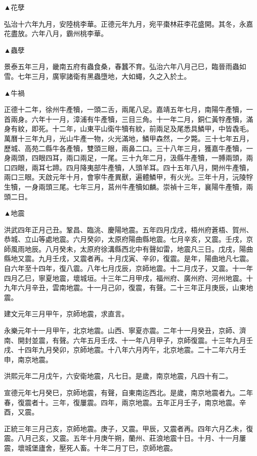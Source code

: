 \begin{pinyinscope}
▲花孽

弘治十六年九月，安陸桃李華。正德元年九月，宛平棗林莊李花盛開。其冬，永嘉花盡放。六年八月，霸州桃李華。

▲蟲孽

景泰五年三月，畿南五府有蟲食桑，春蠶不育。弘治六年八月己巳，臨晉雨蟲如雪。七年三月，廣寧諸衛有黑蟲墮地，大如蠅，久之入於土。

▲牛禍

正德十二年，徐州牛產犢，一頭二舌，兩尾八足。嘉靖五年七月，南陽牛產犢，一首兩身。六年十一月，漳浦有牛產犢，三目三角。十一年二月，銅仁黃牸產犢，滿身有紋，即死。十二年，山東平山衛牛犢有紋，前兩足及尾悉具鱗甲，中皆毳毛。萬曆十三年九月，光山牛產一物，火光滿地，鱗甲森然，一夕斃。三十七年五月，歷城、高苑二縣牛各產犢，雙頭三眼，兩鼻二口。三十八年三月，獲嘉牛產犢，一身兩頭，四眼四耳，兩口兩足，一尾。三十九年二月，汲縣牛產犢，一膊兩頭，兩口四眼，兩耳七蹄。四月降夷部牛產犢，人頭羊耳。四十五年八月，開州牛產犢，兩口三眼。天啟元年十月，會寧牛產異獸，遍體鱗甲，有火光。三年十月，沅陵牸生犢，一身兩頭三尾。七年三月，莒州牛產犢如麟。崇禎十三年，襄陽牛產犢，兩頭二日。

▲地震

洪武四年正月己丑。鞏昌、臨洮、慶陽地震。五年四月戊戌，梧州府蒼梧、賀州、恭城、立山等處地震。六月癸卯，太原府陽曲縣地震。七月辛亥，又震。壬戌，京師風雨地辰。八月癸未，太原府徐溝縣西北中有聲如雷，地震凡三日。戊戌，陽曲縣地又震。九月壬戌，又震者再。十月戊寅、辛卯，復震。是年，陽曲地凡七震。自六年至十四年，復八震。八年七月戊辰，京師地震。十二月戊子，又震。十一年四月乙巳，寧夏地震，壞城垣。十三年二月甲戌，福州府、廣州府、河州地震。十九年六月辛丑，雲南地震。十一月己卯，復震，有聲。二十三年正月庚辰，山東地震。

建文元年三月甲午，京師地震，求直言。

永樂元年十一月甲午，北京地震。山西、寧夏亦震。二年十一月癸丑，京師、濟南、開封並震，有聲。六年五月壬戌、十一年八月甲子，京師復震。十三年九月壬戌、十四年九月癸卯，京師地震。十八年六月丙午，北京地震。二十二年六月壬申，南京地震。

洪熙元年二月戊午，六安衛地震，凡七日。是歲，南京地震，凡四十有二。

宣德元年七月癸巳，京師地震，有聲，自東南迄西北。是歲，南京地震者九。二年春，復震者十。三年，復屢震。四年，兩京地震。五年正月壬子，南京地震。辛酉，又震。

正統三年三月己亥，京師地震。庚子，又震。甲辰，又震者再。四年六月乙未，復震。八月己亥，又震。五年十月庚午朔，蘭州、莊浪地震十日。十月、十一月屢震，壞城堡廬舍，壓死人畜。十年二月丁巳，京師地震。


\end{pinyinscope}
